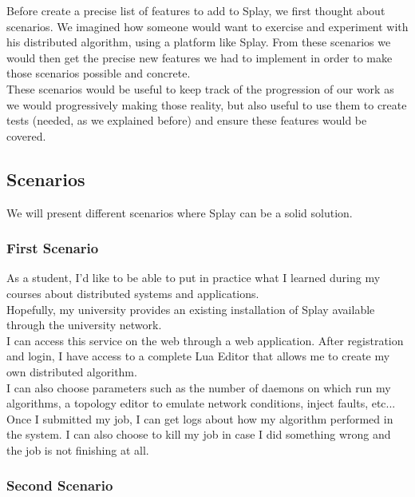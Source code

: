 \documentclass{eplmastersthesis}
\begin{document}
      Before create a precise list of features to add to Splay, we first
      thought about scenarios. We imagined how someone would want to exercise
      and experiment with his distributed algorithm, using a platform like
      Splay. From these scenarios we would then get the precise new features
      we had to implement in order to make those scenarios possible and
      concrete.\\

      These scenarios would be useful to keep track of the progression of our
      work as we would progressively making those reality, but also useful
      to use them to create tests (needed, as we explained before) and ensure
      these features would be covered.

      \subsection{Scenarios}

        We will present different scenarios where Splay can be a solid solution.

        \subsubsection{First Scenario}

          As a student, I'd like to be able to put in practice what I learned
          during my courses about distributed systems and applications.\\
          Hopefully, my university provides an existing installation of Splay
          available through the university network.\\
          I can access this service on the web through a web application. After
          registration and login, I have access to a complete Lua Editor that
          allows me to create my own distributed algorithm.\\
          I can also choose parameters such as the number of daemons on
          which run my algorithms, a topology editor to emulate network
          conditions, inject faults, etc...\\
          Once I submitted my job, I can get logs about how my algorithm
          performed in the system. I can also choose to kill my job in case
          I did something wrong and the job is not finishing at all.

        \subsubsection{Second Scenario}
\end{document}
